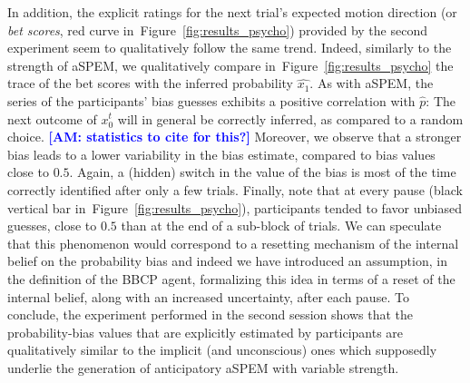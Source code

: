 \documentclass[12pt,english]{article}%
\newcommand{\seeFig}[1]{Figure~\ref{fig:#1}}
\newcommand{\AM}[1]{\textbf{\textcolor{blue}{[AM: #1]}}}
\begin{document}
In addition, the explicit ratings
for the next trial's expected motion direction (or \textit{bet scores}, red curve in~\seeFig{results_psycho})
provided by the second experiment
seem to qualitatively follow the same trend.
Indeed, similarly to the strength of aSPEM,
we qualitatively compare in~\seeFig{results_psycho}
the trace of the bet scores
with the inferred probability $\hat{x_1}$.
As with aSPEM, the series of the participants' bias guesses
exhibits a positive correlation with $\hat{p}$:
The next outcome of $x_{0}^{t}$ will in general be correctly inferred,
as compared to a random choice. \AM{statistics to cite for this?}
Moreover, we observe that a stronger bias leads 
to a lower variability in the bias estimate, compared to bias values close to $0.5$.
Again, a (hidden) switch in the value of the bias is
most of the time correctly identified after only a few trials.
Finally, note that at every pause (black vertical bar in~\seeFig{results_psycho}),
participants tended to favor unbiased guesses, close to $0.5$
than at the end of a sub-block of trials.
We can speculate that this phenomenon would correspond
to a resetting mechanism of the internal belief on the probability bias 
and indeed we have introduced an assumption, in the definition of the BBCP agent, 
formalizing this idea in terms of a reset of the internal belief, 
along with an increased uncertainty, after each pause.
To conclude, the experiment performed in the second session
shows that the probability-bias values that are explicitly estimated by participants
are qualitatively similar to the implicit (and unconscious) ones
which supposedly underlie the generation of anticipatory aSPEM with variable strength.
\end{document}
